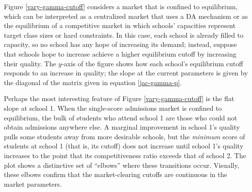 \documentclass[12pt]{article}
\numberwithin{equation}{subsection}
\theoremstyle{definition}
\begin{document}
Figure \ref{vary-gamma-cutoff} considers a market that is confined to equilibrium, which can be interpreted as a centralized market that uses a DA mechanism or as the equilibrium of a competitive market in which schools' capacities represent target class sizes or hard constraints. In this case, each school is already filled to capacity, so no school has any hope of increasing its demand; instead, suppose that schools hope to increase achieve a higher equilibrium cutoff by increasing their quality. The $y$-axis of the figure shows how each school's equilibrium cutoff responds to an increase in quality; the slope at the current parameters is given by the diagonal of the matrix given in equation \eqref{jac-gamma-p}.

Perhaps the most interesting feature of Figure \ref{vary-gamma-cutoff} is the flat slope at school 1. When the single-score admissions market is confined to equilibrium, the bulk of students who attend school 1 are those who could not obtain admissions anywhere else. A marginal improvement in school 1's quality pulls some students away from more desirable schools, but the \emph{minimum} score of students at school 1 (that is, its cutoff) does not increase until school 1's quality increases to the point that its competitiveness ratio exceeds that of school 2. The plot shows a distinctive set of ``elbows'' where these transitions occur. Visually, these elbows confirm that the market-clearing cutoffs are continuous in the market parameters. 
\end{document}
